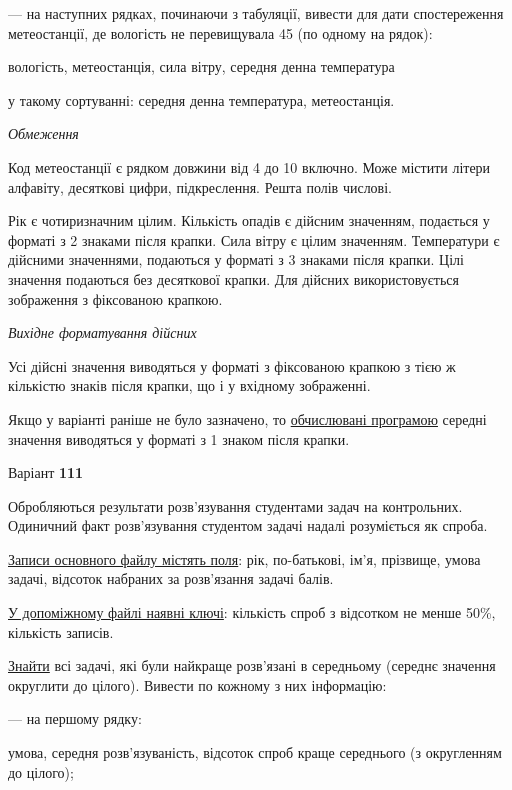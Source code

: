 \documentclass[11pt, ukrainian]{article}
\begin{document}
{\noindent}--- на наступних рядках, починаючи з табуляції, вивести для дати спостереження метеостанції, де вологість не перевищувала 45 (по одному на рядок):\par
вологість, метеостанція, сила вітру, середня денна температура

{\noindent}у такому сортуванні: середня денна температура, метеостанція.


\bigskip\textit{Обмеження}

Код метеостанції є рядком довжини від 4 до 10 включно.
Може містити літери алфавіту, десяткові цифри, підкреслення. Решта полів числові.

Рік є чотиризначним цілим.
Кількість опадів є дійсним значенням, подається у форматі з 2 знаками після крапки.
Сила вітру є цілим значенням.
Температури є дійсними значеннями, подаються у форматі з 3 знаками після крапки.
Цілі значення подаються без десяткової крапки.
Для дійсних використовується зображення з фіксованою крапкою.

\textit{Вихідне форматування дійсних}

Усі дійсні значення виводяться у форматі з фіксованою крапкою з тією ж кількістю знаків після крапки, що і у вхідному зображенні.

Якщо у варіанті раніше не було зазначено, то \underline{обчислювані програмою} середні значення виводяться у форматі з 1 знаком після крапки.




\par
\newpage
{\center Варіант  \No \textbf { 111 }\par}
\bigskip
Обробляються результати розв’язування студентами задач на контрольних.
Одиничний факт роз\-в’я\-зу\-вання студентом задачі надалі розуміється як спроба.

\underline{Записи основного файлу містять поля}: рік, по-батькові, ім’я, прізвище, умова задачі, відсоток набраних за розв’язання задачі балів.

\underline{У допоміжному файлі наявні ключі}: кількість спроб з відсотком не менше 50\%, кількість записів.

\underline{Знайти} всі задачі, які були найкраще розв’язані в середньому (середнє значення округлити до цілого). Вивести по кожному з них інформацію:\par
{\noindent}--- на першому рядку:\par
умова, середня розв’язуваність, відсоток спроб краще середнього (з округленням до цілого);
\end{document}
